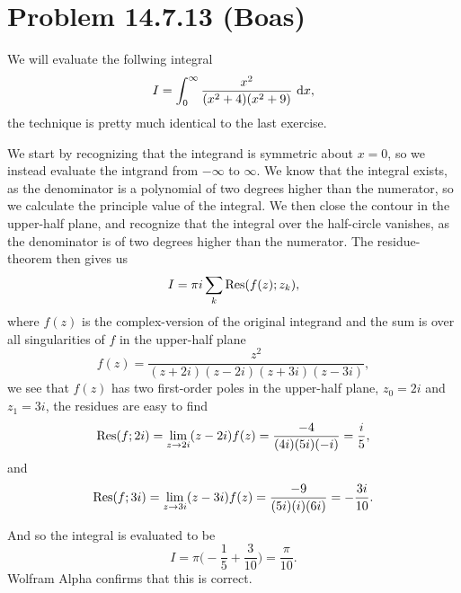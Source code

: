 \documentclass[a4paper, 11pt, titlepage, english]{article}
\newcommand{\Res}[2]{{\rm Res}(#1;#2)}
\begin{document}
\clearpage

\section*{Problem 14.7.13 (Boas)}
We will evaluate the follwing integral
$$I = \int_0^{\infty} \frac{x^2}{(x^2+4)(x^2+9)} {\rm\ d}x,$$
the technique is pretty much identical to the last exercise. 

We start by recognizing that the integrand is symmetric about $x=0$, so we instead evaluate the intgrand from $-\infty$ to $\infty$. We know that the integral exists, as the denominator is a polynomial of two degrees higher than the numerator, so we calculate the principle value of the integral. We then close the contour in the upper-half plane, and recognize that the integral over the half-circle vanishes, as the denominator is of two degrees higher than the numerator. The residue-theorem then gives us
$$I = \pi i \sum_k \Res{f(z)}{z_k},$$
where $f(z)$ is the complex-version of the original integrand and the sum is over all singularities of $f$ in the upper-half plane
$$f(z) = \frac{z^2}{(z + 2i)(z-2i)(z+3i)(z-3i)},$$
we see that $f(z)$ has two first-order poles in the upper-half plane, $z_0 = 2i$ and $z_1 = 3i$, the residues are easy to find
$$\Res{f}{2i} = \lim_{z \to 2i}(z-2i)f(z) = \frac{-4}{(4i)(5i)(-i)} = \frac{i}{5}, $$
and
$$\Res{f}{3i} = \lim_{z \to 3i}(z-3i)f(z) = \frac{-9}{(5i)(i)(6i)} = -\frac{3i}{10}.$$

And so the integral is evaluated to be
$$I = \pi\bigg(-\frac{1}{5} + \frac{3}{10}\bigg) = \frac{\pi}{10}.$$
Wolfram Alpha confirms that this is correct.
\end{document}
